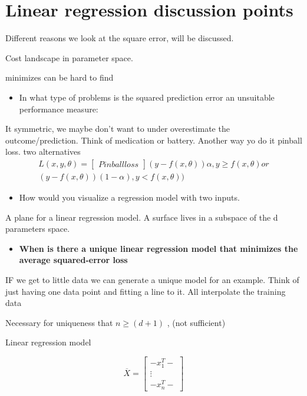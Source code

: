 \section{Linear regression discussion points}
Different reasons we look at the square error, will be discussed. 

Cost landscape in parameter space. 

minimizes can be hard to find 

\begin{itemize}
	\item In what type of problems is the squared prediction error an unsuitable performance measure:
\end{itemize}

It symmetric, we maybe don't want to under overestimate the outcome/prediction. Think of medication or battery. Another way yo do it 
pinball loss. two alternatives 
\begin{equation}
\begin{aligned}
L(x,y,\theta ) = \begin{bmatrix} Pinball loss \end{bmatrix} (y-f(x,\theta)) \alpha , y \ge f(x, \theta) or \\
(y-f(x,\theta))(1-\alpha), y < f(x, \theta))
\end{aligned}
\end{equation}

\begin{itemize}
	\item How would you visualize a regression model with two inputs.
\end{itemize}

A plane for a linear regression model. A surface lives in a subspace of the d parameters space. 

\begin{itemize}
	\item \textbf{When is there a unique linear regression model that minimizes the average squared-error loss} 
\end{itemize}

IF we get to little data we can generate a unique model for an example. Think of just having one data point and fitting a line to it. 
All interpolate the training data 

Necessary for uniqueness that $n \ge (d+1)$ , (not sufficient)

Linear regression model

\begin{equation}
\overline{X} = \begin{bmatrix} -x_1^{T}- \\ \vdots \\ -x_n^{T}- \end{bmatrix}
\end{equation}

